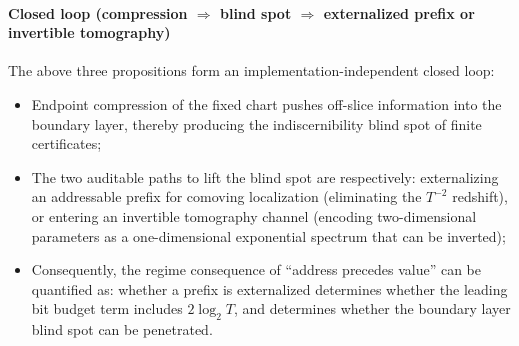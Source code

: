 \paragraph{Closed loop (compression \texorpdfstring{$\Rightarrow$}{=>} blind spot \texorpdfstring{$\Rightarrow$}{=>} externalized prefix or invertible tomography)}
The above three propositions form an implementation-independent closed loop:
\begin{itemize}
  \item Endpoint compression of the fixed chart pushes off-slice information into the boundary layer, thereby producing the indiscernibility blind spot of finite certificates;
  \item The two auditable paths to lift the blind spot are respectively: externalizing an addressable prefix for comoving localization (eliminating the \(T^{-2}\) redshift), or entering an invertible tomography channel (encoding two-dimensional parameters as a one-dimensional exponential spectrum that can be inverted);
  \item Consequently, the regime consequence of ``address precedes value'' can be quantified as: whether a prefix is externalized determines whether the leading bit budget term includes \(2\log_2T\), and determines whether the boundary layer blind spot can be penetrated.
\end{itemize}

\endinput
